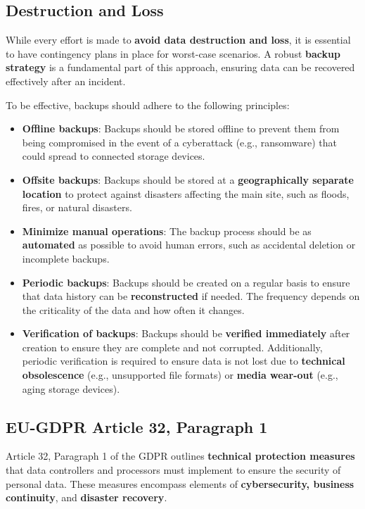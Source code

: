 \subsection{Destruction and Loss}
While every effort is made to \textbf{avoid data destruction and
loss}, it is essential to have contingency plans in place for
worst-case scenarios. A robust \textbf{backup strategy} is a
fundamental part of this approach, ensuring data can be recovered
effectively after an incident.

To be effective, backups should adhere to the following principles:
\begin{itemize}
  \item \textbf{Offline backups}:  Backups should be stored offline to
    prevent them from being compromised in the event of a cyberattack
    (e.g., ransomware) that could spread to connected storage devices.  
  \item \textbf{Offsite backups}:  Backups should be stored at a
    \textbf{geographically separate location} to protect against
    disasters affecting the main site, such as floods, fires, or
    natural disasters.  
  \item \textbf{Minimize manual operations}:  The backup process
    should be as \textbf{automated} as possible to avoid human errors,
    such as accidental deletion or incomplete backups.  
  \item \textbf{Periodic backups}:  Backups should be created on a
    regular basis to ensure that data history can be
    \textbf{reconstructed} if needed. The frequency depends on the
    criticality of the data and how often it changes.  
  \item \textbf{Verification of backups}:  Backups should be
    \textbf{verified immediately} after creation to ensure they are
    complete and not corrupted. Additionally, periodic verification is
    required to ensure data is not lost due to \textbf{technical
    obsolescence} (e.g., unsupported file formats) or \textbf{media
    wear-out} (e.g., aging storage devices).  
\end{itemize}

\subsection{EU-GDPR Article 32, Paragraph 1}

Article 32, Paragraph 1 of the GDPR outlines \textbf{technical
protection measures} that data controllers and processors must
implement to ensure the security of personal data. These measures
encompass elements of \textbf{cybersecurity, business continuity}, and
\textbf{disaster recovery}.

